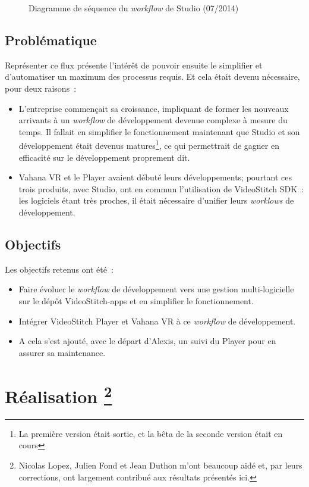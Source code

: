 \begin{figure}
  \centering
  \caption{Diagramme de séquence du \textit{workflow} de Studio (07/2014)}
	\label{workflow-studio}
\end{figure}

\subsection{Problématique}
Représenter ce flux présente l'intérêt de pouvoir ensuite le simplifier et d'automatiser
un maximum des processus requis. Et cela était devenu nécessaire, pour deux raisons~:
\begin{itemize}
  \item L'entreprise commençait sa croissance, impliquant de former les nouveaux arrivants
  à un \textit{workflow} de développement devenue complexe à mesure du temps. Il fallait en
  simplifier le fonctionnement maintenant que Studio et son développement était
  devenus matures\footnote{La première version était sortie, et la bêta de la seconde
  version était en cours}, ce qui permettrait de gagner en efficacité sur le développement
  proprement dit.
  \item Vahana VR et le Player avaient débuté leurs développements; pourtant ces trois
  produits, avec Studio, ont en commun l'utilisation de VideoStitch SDK~: les logiciels
  étant très proches, il était nécessaire d'unifier leurs \textit{worklows} de développement.
\end{itemize}

\subsection{Objectifs}
Les objectifs retenus ont été~:
\begin{itemize}
  \item Faire évoluer le \textit{workflow} de développement vers une gestion multi-logicielle sur le dépôt VideoStitch-apps 
  et en simplifier le fonctionnement.
  \item Intégrer VideoStitch Player et Vahana VR à ce \textit{workflow} de développement.
  \item A cela s'est ajouté, avec le départ d'Alexis, un suivi du Player pour en assurer
  sa maintenance.
\end{itemize}


\section[Réalisation]{Réalisation
\protect\footnote{Nicolas Lopez, Julien Fond et Jean Duthon m'ont beaucoup aidé et, par 
leurs corrections, ont largement contribué aux résultats présentés ici.}}


